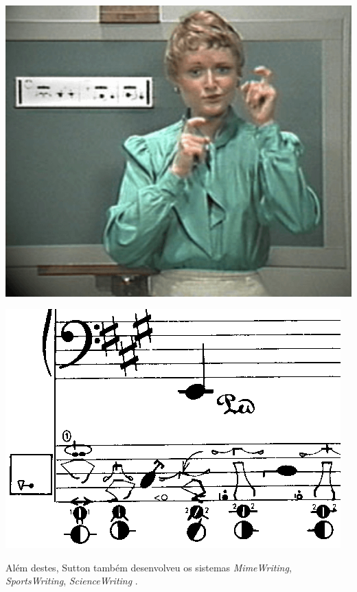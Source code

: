 \documentclass[10pt]{beamer}
\theoremstyle{plain}
\theoremstyle{definition}
\begin{document}
\begin{frame}
{			\vspace{-4.0cm}
			\hspace{3cm}
			\includegraphics[scale=0.2]{figures/valerie-sutton-ensinando-signwriting-1985.png}
			
			{\vspace{-3.0cm}
				\hspace{6.8cm}
			\includegraphics[scale=0.26]{figures/dwd0040.png}
			}
		
			\vspace{1.0cm}
			Além destes, Sutton também desenvolveu os sistemas \textit{MimeWriting}, \textit{SportsWriting}, \textit{ScienceWriting} \cite{sutton2015history}.
		}	
	\end{frame}
\end{document}
